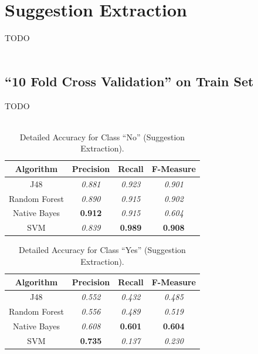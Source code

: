 \section{Suggestion Extraction}\label{42_ref}
TODO\\
\\
\subsection{``10 Fold Cross Validation'' on Train Set}\label{421_ref}
TODO\\
\\

\begin{table}[H]
\centering
\caption{Detailed Accuracy for Class “No” (Suggestion Extraction).}
\label{45_table_ref}
\begin{tabular}{cccc}
\hline
{\bf Algorithm} & {\bf Precision} & {\bf Recall} & {\bf F-Measure} \\ \hline
J48             & {\it 0.881}     & {\it 0.923}  & {\it 0.901}     \\
Random Forest   & {\it 0.890}      & {\it 0.915}  & {\it 0.902}     \\
Native Bayes    & {\bf 0.912}     & {\it 0.915}  & {\it 0.604}     \\
SVM             & {\it 0.839}     & {\bf 0.989}  & {\bf 0.908}     \\ \hline
\end{tabular}
\end{table}

\begin{table}[H]
\centering
\caption{Detailed Accuracy for Class “Yes” (Suggestion Extraction).}
\label{46_table_ref}
\begin{tabular}{cccc}
\hline
{\bf Algorithm} & {\bf Precision} & {\bf Recall} & {\bf F-Measure} \\ \hline
J48             & {\it 0.552}     & {\it 0.432}  & {\it 0.485}     \\
Random Forest   & {\it 0.556}     & {\it 0.489}  & {\it 0.519}     \\
Native Bayes    & {\it 0.608}     & {\bf 0.601}  & {\bf 0.604}     \\
SVM             & {\bf 0.735}     & {\it 0.137}  & {\it 0.230}     \\ \hline
\end{tabular}
\end{table}

